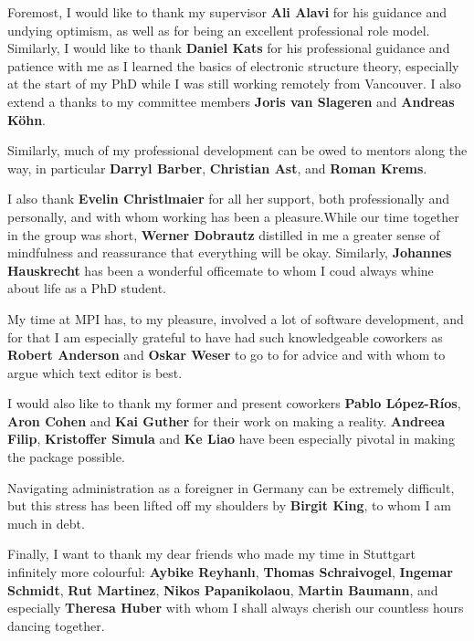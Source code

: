 
Foremost, I would like to thank my supervisor \textbf{Ali Alavi} for his guidance and undying optimism, as well as for being an excellent professional role model. Similarly, I would like to thank \textbf{Daniel Kats} for his professional guidance and patience with me as I learned the basics of electronic structure theory, especially at the start of my PhD while I was still working remotely from Vancouver. I also extend a thanks to my committee members \textbf{Joris van Slageren} and \textbf{Andreas K\"ohn}.

Similarly, much of my professional development can be owed to mentors along the way, in particular \textbf{Darryl Barber}, \textbf{Christian Ast}, and \textbf{Roman Krems}.

I also thank \textbf{Evelin Christlmaier} for all her support, both professionally and personally, and with whom working has been a pleasure.While our time together in the group was short, \textbf{Werner Dobrautz} distilled in me a greater sense of mindfulness and reassurance that everything will be okay. Similarly, \textbf{Johannes Hauskrecht} has been a wonderful officemate to whom I coud always whine about life as a PhD student.

My time at MPI has, to my pleasure, involved a lot of software development, and for that I am especially grateful to have had such knowledgeable coworkers as \textbf{Robert Anderson} and \textbf{Oskar Weser} to go to for advice and with whom to argue which text editor is best.

I would also like to thank my former and present coworkers \textbf{Pablo L\'opez-R\'ios}, \textbf{Aron Cohen} and \textbf{Kai Guther} for their work on making \tchint a reality. \textbf{Andreea Filip}, \textbf{Kristoffer Simula} and \textbf{Ke Liao} have been especially pivotal in making the \pytchint package possible.


Navigating administration as a foreigner in Germany can be extremely difficult, but this stress has been lifted off my shoulders by \textbf{Birgit King}, to whom I am much in debt.


Finally, I want to thank my dear friends who made my time in Stuttgart infinitely more colourful: \textbf{Aybike Reyhanl\i}, \textbf{Thomas Schraivogel}, \textbf{Ingemar Schmidt}, \textbf{Rut Martinez}, \textbf{Nikos Papanikolaou}, \textbf{Martin Baumann}, and especially \textbf{Theresa Huber} with whom I shall always cherish our countless hours dancing together.
